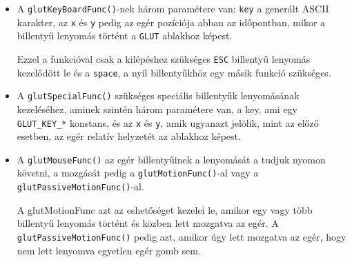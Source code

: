 \begin{itemize}
\item A \texttt{glutKeyBoardFunc()}-nek három paramétere van: \texttt{key} a generált ASCII karakter, az \texttt{x} és \texttt{y} pedig az egér pozíciója abban az időpontban, mikor a billentyű lenyomás történt a \texttt{GLUT} ablakhoz képest.

 Ezzel a funkcióval csak a kilépéshez szükséges \texttt{ESC} billentyű lenyomás kezelődött le és a \texttt{space}, a nyíl billentyűkhöz egy másik funkció szükséges.\cite{keyboardfunc}
\item A \texttt{glutSpecialFunc()} szükséges speciális billentyűk lenyomásának kezeléséhez,  
aminek szintén három paramétere van, a key, ami egy \texttt{GLUT\_KEY\_*} konstans, és az \texttt{x} és \texttt{y}, amik ugyanazt jelölik, mint az előző esetben, az egér relatív helyzetét az ablakhoz képest.\cite{keyboardspec}
\item A \texttt{glutMouseFunc()} az egér billentyűinek a lenyomását a  tudjuk nyomon követni, a mozgását pedig a \texttt{glutMotionFunc()}-al vagy a \texttt{glutPassiveMotionFunc()}-al. 

A glutMotionFunc azt az eshetőséget kezelei le, amikor egy vagy több billentyű lenyomás történt és közben lett mozgatva az egér. A \texttt{glutPassiveMotionFunc()} pedig azt, amikor úgy lett mozgatva az egér, hogy nem lett lenyomva egyetlen egér gomb sem.\cite{mousemot}\cite{mousefunc}
\end{itemize}
